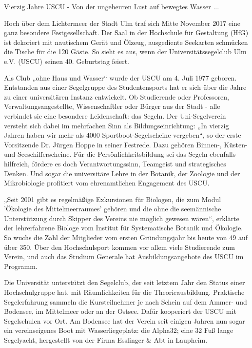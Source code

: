 Vierzig Jahre USCU -  Von der ungeheuren Lust auf bewegtes Wasser ... 

Hoch über dem Lichtermeer der Stadt Ulm traf sich Mitte November 2017 eine ganz besondere Festgesellschaft. Der Saal in der Hochschule für Gestaltung (HfG) ist dekoriert mit nautischem Gerät und Ölzeug, ausgediente Seekarten schmücken die Tische für die 120 Gäste. So sieht es aus, wenn der Universitätssegelclub Ulm e.V. (USCU) seinen 40. Geburtstag feiert. 

Als Club „ohne Haus und Wasser“ wurde der USCU am 4. Juli 1977 geboren. Entstanden aus einer Segelgruppe des Studentensports hat er sich über die Jahre zu einer universitären Instanz entwickelt. Ob Studierende oder Professoren, Verwaltungsangestellte, Wissenschaftler oder Bürger aus der Stadt - alle verbindet sie eine besondere Leidenschaft: das Segeln. Der Uni-Segelverein versteht sich dabei im mehrfachen Sinn als Bildungseinrichtung: „In vierzig Jahren haben wir mehr als 4000 Sportboot-Segelscheine vergeben“, so der erste Vorsitzende Dr. Jürgen Hoppe in seiner Festrede. Dazu gehören Binnen-, Küsten- und Seeschifferscheine. Für die Persönlichkeitsbildung sei das Segeln ebenfalls hilfreich, fördere es doch Verantwortungssinn, Teamgeist und strategisches Denken. Und sogar die universitäre Lehre in der Botanik, der Zoologie und der Mikrobiologie profitiert vom ehrenamtlichen Engagement des USCU. 

„Seit 2001 gibt es regelmäßige Exkursionen für Biologen, die zum Modul 'Ökologie des Mittelmeerraumes' gehören und die ohne die seemännische Unterstützung durch Skipper des Vereins nie möglich gewesen wären“, erklärte der lehrerfahrene Biologe vom Institut für Systematische Botanik und Ökologie. So wuchs die Zahl der Mitglieder vom ersten Gründungsjahr bis heute von 49 auf über 350. Über den Hochschulsport kommen vor allem viele Studierende zum Verein, und auch das Studium Generale hat Ausbildungsangebote des USCU im Programm. 

Die Universität unterstützt den Segelclub, der seit letztem Jahr den Status einer Hochschulgruppe hat, mit Räumlichkeiten für die Theorieausbildung. Praktische Segelerfahrung sammeln die Kursteilnehmer je nach Schein auf dem Ammer- und Bodensee, im Mittelmeer oder an der Ostsee. Dafür kooperiert der USCU mit Segelschulen vor Ort. Am Bodensee hat der Verein seit einigen Jahren nun sogar ein vereinseigenes Boot mit Wasserliegeplatz: die Alpha32; eine 32 Fuß lange Segelyacht, hergestellt von der Firma Esslinger \& Abt in Laupheim. 


